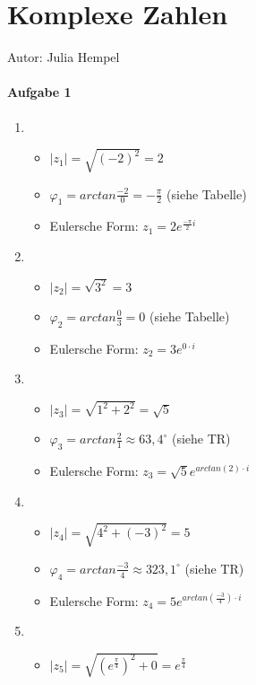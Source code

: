 \chapter{Komplexe Zahlen}

	Autor: Julia Hempel
	
\subsubsection{Aufgabe 1}
	
	\begin{enumerate}

	\item
			\begin{itemize}
				\item $|z_{1}|=\sqrt{(-2)^{2}}=2$
				\item $\varphi_{1} = arctan\frac{-2}{0} = -\frac{\pi}{2}$ (siehe Tabelle)
				\item Eulersche Form: $z_{1} = 2e^{\frac{-\pi}{2}i}$
			\end{itemize}
	\item
			\begin{itemize}
				\item $|z_{2}|=\sqrt{3^{2}}=3$
				\item $\varphi_{2} = arctan\frac{0}{3} = 0$ (siehe Tabelle)
				\item Eulersche Form: $z_{2} = 3e^{0\cdot i}$
			\end{itemize}			
	\item
			\begin{itemize}
				\item $|z_{3}|=\sqrt{1^{2}+2^{2}}=\sqrt{5}$
				\item $\varphi_{3} = arctan\frac{2}{1} \approx 63,4^\circ$ (siehe TR)
				\item Eulersche Form: $z_{3} = \sqrt{5}e^{arctan(2)\cdot i}$
			\end{itemize}				
	\item
			\begin{itemize}
				\item $|z_{4}|=\sqrt{4^{2}+(-3)^{2}}=5$
				\item $\varphi_{4} = arctan\frac{-3}{4} \approx 323,1^\circ$ (siehe TR)
				\item Eulersche Form: $z_{4} = 5e^{arctan(\frac{-3}{4})\cdot i}$
			\end{itemize}			
	\item
			\begin{itemize}
				\item $|z_{5}|=\sqrt{\left(e^{\frac{\pi}{4}}\right)^{2}+0}=e^{\frac{\pi}{4}}$

\end{itemize}
\end{enumerate}

